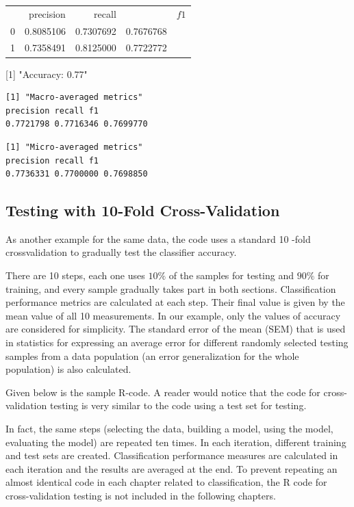 \documentclass[11pt,openany,executivepaper]{book}
\begin{document}
\begin{center}
\begin{tabular}{rrrrr}
 & precision & recall &  & $f 1$ \\
0 & 0.8085106 & 0.7307692 & 0.7676768 &  \\
1 & 0.7358491 & 0.8125000 & 0.7722772 &  \\
\end{tabular}
\end{center}

[1] "Accuracy: 0.77"

\begin{verbatim}
[1] "Macro-averaged metrics"
precision recall f1
0.7721798 0.7716346 0.7699770
\end{verbatim}

\begin{verbatim}
[1] "Micro-averaged metrics"
precision recall f1
0.7736331 0.7700000 0.7698850
\end{verbatim}

\subsection{Testing with 10-Fold Cross-Validation}
As another example for the same data, the code uses a standard 10 -fold crossvalidation to gradually test the classifier accuracy.

There are 10 steps, each one uses $10 \%$ of the samples for testing and $90 \%$ for training, and every sample gradually takes part in both sections. Classification performance metrics are calculated at each step. Their final value is given by the mean value of all 10 measurements. In our example, only the values of accuracy are considered for simplicity. The standard error of the mean (SEM) that is used in statistics for expressing an average error for different randomly selected testing samples from a data population (an error generalization for the whole population) is also calculated.

Given below is the sample R-code. A reader would notice that the code for cross-validation testing is very similar to the code using a test set for testing.

In fact, the same steps (selecting the data, building a model, using the model, evaluating the model) are repeated ten times. In each iteration, different training and test sets are created. Classification performance measures are calculated in each iteration and the results are averaged at the end. To prevent repeating an almost identical code in each chapter related to classification, the R code for cross-validation testing is not included in the following chapters.
\end{document}
